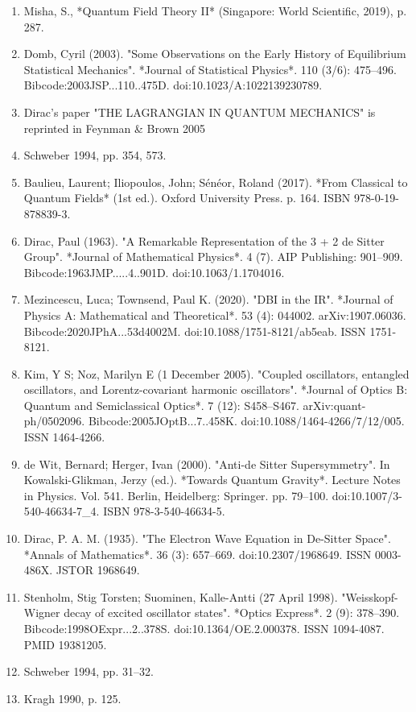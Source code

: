 \begin{enumerate}
\item Misha, S., *Quantum Field Theory II* (Singapore: World Scientific, 2019), p. 287.
\item Domb, Cyril (2003). "Some Observations on the Early History of Equilibrium Statistical Mechanics". *Journal of Statistical Physics*. 110 (3/6): 475–496. Bibcode:2003JSP...110..475D. doi:10.1023/A:1022139230789.
\item Dirac's paper "THE LAGRANGIAN IN QUANTUM MECHANICS" is reprinted in Feynman & Brown 2005
\item Schweber 1994, pp. 354, 573.
\item Baulieu, Laurent; Iliopoulos, John; Sénéor, Roland (2017). *From Classical to Quantum Fields* (1st ed.). Oxford University Press. p. 164. ISBN 978-0-19-878839-3.
\item Dirac, Paul (1963). "A Remarkable Representation of the 3 + 2 de Sitter Group". *Journal of Mathematical Physics*. 4 (7). AIP Publishing: 901–909. Bibcode:1963JMP.....4..901D. doi:10.1063/1.1704016.
\item Mezincescu, Luca; Townsend, Paul K. (2020). "DBI in the IR". *Journal of Physics A: Mathematical and Theoretical*. 53 (4): 044002. arXiv:1907.06036. Bibcode:2020JPhA...53d4002M. doi:10.1088/1751-8121/ab5eab. ISSN 1751-8121.
\item Kim, Y S; Noz, Marilyn E (1 December 2005). "Coupled oscillators, entangled oscillators, and Lorentz-covariant harmonic oscillators". *Journal of Optics B: Quantum and Semiclassical Optics*. 7 (12): S458–S467. arXiv:quant-ph/0502096. Bibcode:2005JOptB...7..458K. doi:10.1088/1464-4266/7/12/005. ISSN 1464-4266.
\item de Wit, Bernard; Herger, Ivan (2000). "Anti-de Sitter Supersymmetry". In Kowalski-Glikman, Jerzy (ed.). *Towards Quantum Gravity*. Lecture Notes in Physics. Vol. 541. Berlin, Heidelberg: Springer. pp. 79–100. doi:10.1007/3-540-46634-7_4. ISBN 978-3-540-46634-5.
\item Dirac, P. A. M. (1935). "The Electron Wave Equation in De-Sitter Space". *Annals of Mathematics*. 36 (3): 657–669. doi:10.2307/1968649. ISSN 0003-486X. JSTOR 1968649.
\item Stenholm, Stig Torsten; Suominen, Kalle-Antti (27 April 1998). "Weisskopf-Wigner decay of excited oscillator states". *Optics Express*. 2 (9): 378–390. Bibcode:1998OExpr...2..378S. doi:10.1364/OE.2.000378. ISSN 1094-4087. PMID 19381205.
\item Schweber 1994, pp. 31–32.
\item Kragh 1990, p. 125.

\end{enumerate}
